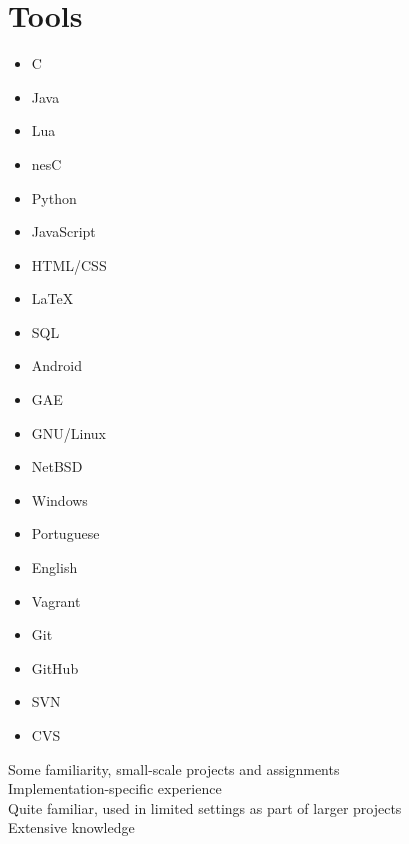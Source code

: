 \documentclass[a4paper,10pt]{article}
\begin{document}
\section{Tools}

\begin{multicols}{3}
  \begin{itemize}
    \renewcommand{\labelitemi}{\textcolor{lightg}{\symbol{"00BB}}}
    \setlength{\itemsep}{1pt}
    \setlength{\parskip}{0pt}
    \setlength{\parsep}{0pt}
  \item C \hfill \threenotes 
  \item Java \hfill \threenotes
  \item Lua \hfill \threenotes
  \item nesC \hfill \onenote
  \item Python \hfill \twonotes
  \item JavaScript \hfill \twonotes
  \item HTML/CSS \hfill \twonotes
  \item \LaTeX \hfill \twonotes
  \item SQL \hfill \twonotes
  \item Android \hfill \threenotes
  \item GAE \hfill \twonotes
  \item GNU/Linux \hfill \threenotes
  \item NetBSD \hfill \twonotes
  \item Windows \hfill \twonotes
  \item Portuguese \hfill \fournotes
  \item English \hfill \threenotes
  \item Vagrant \hfill \threenotes
  \item Git \hfill \twonotes
  \item GitHub \hfill \twonotes
  \item SVN \hfill \onenote
  \item CVS \hfill \onenote
  \end{itemize} 
\end{multicols}

\vspace{1em}

\begin{center}
  \parbox{12cm}{
    \onenote Some familiarity, small-scale projects and assignments \\
    \twonotes Implementation-specific experience \\
    \threenotes Quite familiar, used in limited settings as part of larger projects \\
    \fournotes Extensive knowledge
  }
\end{center}
\end{document}
